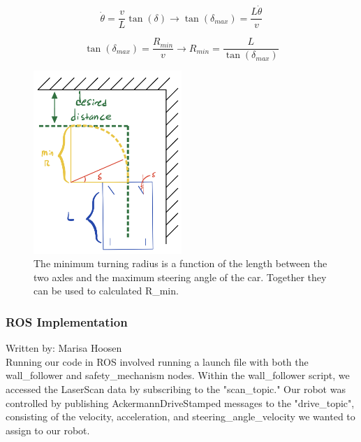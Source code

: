 \documentclass{article}
\begin{document}
\begin{equation}
    \dot\theta = \frac{v}{L}\tan(\delta) \rightarrow \tan(\delta_{max}) = \frac{L\dot\theta}{v}
\end{equation}

\begin{equation}
    \tan(\delta_{max}) = \frac{R_{min}}{v} \rightarrow R_{min} = \frac{L}{\tan(\delta_{max})}
\end{equation}

\begin{figure}[h]
\begin{center}
\includegraphics[width=0.5\textwidth]{imgs/min_r.png} %
\caption{The minimum turning radius is a function of the length between the two axles and the maximum steering angle of the car. Together they can be used to calculated R_{min}.}
\end{center}
\end{figure}

\subsubsection{ROS Implementation}
Written by: Marisa Hoosen\\

Running our code in ROS involved running a launch file with both the wall\_follower and safety\_mechanism nodes. Within the wall\_follower script, we accessed the LaserScan data by subscribing to the "scan\_topic." Our robot was controlled by publishing AckermannDriveStamped messages to the "drive\_topic", consisting of the velocity, acceleration, and steering\_angle\_velocity we wanted to assign to our robot. \\
\end{document}
